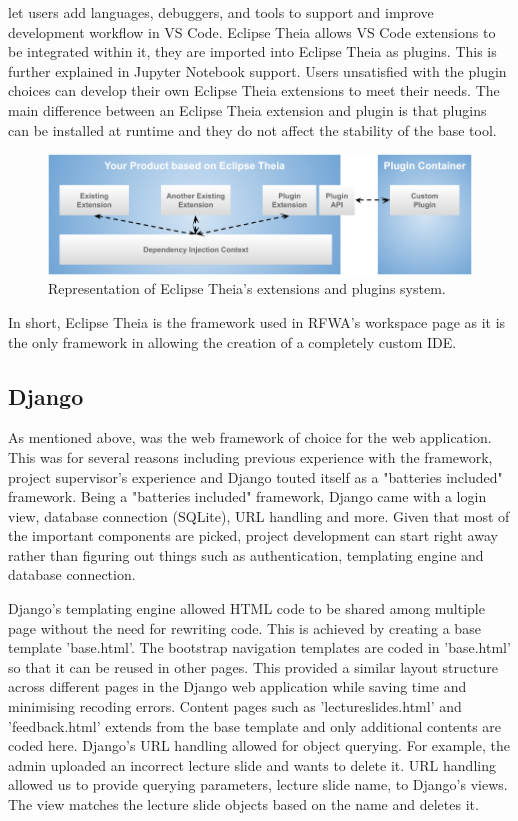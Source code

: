 \documentclass{l4proj}
\begin{document}
\cite{VSMarketplace} let users add languages, debuggers, and tools to support and improve development workflow in VS Code. Eclipse Theia allows VS Code extensions to be integrated within it, they are imported into Eclipse Theia as plugins. This is further explained in Jupyter Notebook support. Users unsatisfied with the plugin choices can develop their own Eclipse Theia extensions to meet their needs. The main difference between an Eclipse Theia extension and plugin is that plugins can be installed at runtime and they do not affect the stability of the base tool. 

\begin{figure}[h]
    \centering
    \includegraphics[scale=0.75]{images/extension_plugin.png}
    \caption{Representation of Eclipse Theia's extensions and plugins system.}
\end{figure}


In short, Eclipse Theia is the framework used in RFWA's workspace page as it is the only framework in allowing the creation of a completely custom IDE.

\subsection{Django}
As mentioned above, \cite{Django} was the web framework of choice for the web application. This was for several reasons including previous experience with the framework, project supervisor's experience and Django touted itself as a "batteries included" framework. Being a "batteries included" framework, Django came with a login view, database connection (SQLite), URL handling and more. Given that most of the important components are picked, project development can start right away rather than figuring out things such as authentication, templating engine and database connection.

Django's templating engine allowed HTML code to be shared among multiple page without the need for rewriting code. This is achieved by creating a base template 'base.html'. The bootstrap navigation templates are coded in 'base.html' so that it can be reused in other pages. This provided a similar layout structure across different pages in the Django web application while saving time and minimising recoding errors. Content pages such as 'lectureslides.html' and 'feedback.html' extends from the base template and only additional contents are coded here. Django's URL handling allowed for object querying. For example, the admin uploaded an incorrect lecture slide and wants to delete it. URL handling allowed us to provide querying parameters, lecture slide name, to Django's views. The view matches the lecture slide objects based on the name and deletes it. 
\end{document}
